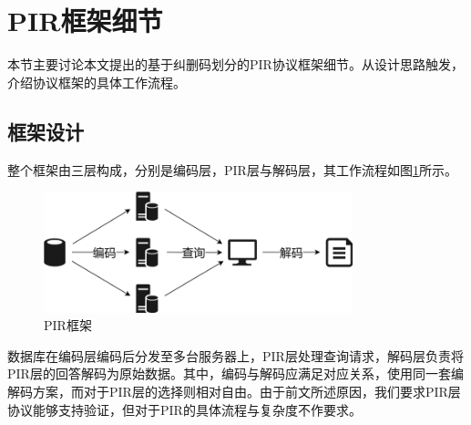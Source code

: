 \section{PIR框架细节}
\label{sec:pir-framework}

本节主要讨论本文提出的基于纠删码划分的PIR协议框架细节。从设计思路触发，介绍协议框架的具体工作流程。

\subsection{框架设计}
整个框架由三层构成，分别是编码层，PIR层与解码层，其工作流程如图\ref{fig:pir-framework}所示。

\begin{figure}
    \centering
    \includegraphics[width=0.8\textwidth]{figure/PIR-framework.png}
    \caption{PIR框架}
    \label{fig:pir-framework}
\end{figure}

数据库在编码层编码后分发至多台服务器上，PIR层处理查询请求，解码层负责将PIR层的回答解码为原始数据。其中，编码与解码应满足对应关系，使用同一套编解码方案，而对于PIR层的选择则相对自由。由于前文所述原因，我们要求PIR层协议能够支持验证，但对于PIR的具体流程与复杂度不作要求。

